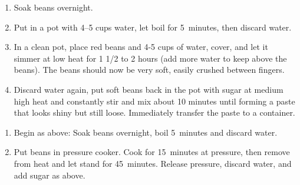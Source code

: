 \label{あんこ}

\begin{ingredients}
\end{ingredients}


\begin{recipe}
  \begin{enumerate}

  \item Soak beans overnight.
    
  \item Put in a pot with 4--5 cups water, let boil for 5~minutes, then discard water.
    
  \item In a clean pot, place red beans and 4-5 cups of water, cover,
    and let it simmer at low heat for 1 1/2 to 2 hours (add more water
    to keep above the beans). The beans should now be very soft,
    easily crushed between fingers.
    
  \item Discard water again, put soft beans back in the pot with sugar
    at medium high heat and constantly stir and mix about 10 minutes
    until forming a paste that looks shiny but still
    loose. Immediately transfer the paste to a container.

  \end{enumerate}
\end{recipe}


\begin{recipe}
  \begin{enumerate}
  \item Begin as above:  Soak beans overnight, boil 5~minutes and discard water.

  \item Put beans in pressure cooker.  Cook for 15~minutes at
    pressure, then remove from heat and let stand for 45~minutes.
    Release pressure, discard water, and add sugar as above.

  \end{enumerate}
\end{recipe}

